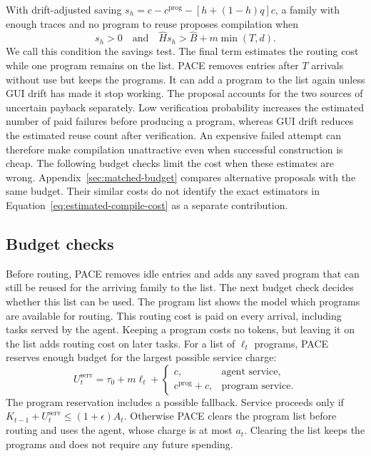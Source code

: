 With drift-adjusted saving $s_h=c-c^{\mathrm{prog}}-[h+(1-h)q]c$, a family with enough traces and no program to reuse proposes compilation when
\begin{equation}
s_h>0\quad\text{and}\quad\hat Hs_h>\hat B+m\min(T,d).
\label{eq:trigger}
\end{equation}
We call this condition the savings test.
The final term estimates the routing cost while one program remains on the list.
PACE removes entries after $T$ arrivals without use but keeps the programs.
It can add a program to the list again unless GUI drift has made it stop working.
The proposal accounts for the two sources of uncertain payback separately.
Low verification probability increases the estimated number of paid failures before producing a program, whereas GUI drift reduces the estimated reuse count after verification.
An expensive failed attempt can therefore make compilation unattractive even when successful construction is cheap.
The following budget checks limit the cost when these estimates are wrong.
Appendix~\ref{sec:matched-budget} compares alternative proposals with the same budget.
Their similar costs do not identify the exact estimators in Equation~\ref{eq:estimated-compile-cost} as a separate contribution.

\subsection{Budget checks}
\label{sec:budget-checks}

Before routing, PACE removes idle entries and adds any saved program that can still be reused for the arriving family to the list.
The next budget check decides whether this list can be used.
The program list shows the model which programs are available for routing.
This routing cost is paid on every arrival, including tasks served by the agent.
Keeping a program costs no tokens, but leaving it on the list adds routing cost on later tasks.
For a list of $\ell_t$ programs, PACE reserves enough budget for the largest possible service charge:
\begin{equation}
U_t^{\mathrm{serv}}=\tau_0+m\ell_t+
\begin{cases}
c,&\text{agent service},\\
c^{\mathrm{prog}}+c,&\text{program service}.
\end{cases}
\label{eq:service-reserve}
\end{equation}
The program reservation includes a possible fallback.
Service proceeds only if $K_{t-1}+U_t^{\mathrm{serv}}\leq(1+\epsilon)A_t$.
Otherwise PACE clears the program list before routing and uses the agent, whose charge is at most $a_t$.
Clearing the list keeps the programs and does not require any future spending.

